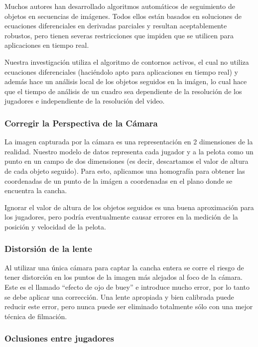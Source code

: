 \documentclass[a4paper,10pt]{article}
\begin{document}
Muchos autores han desarrollado algoritmos automáticos de seguimiento de
objetos en secuencias de imágenes. Todos ellos están basados en soluciones de
ecuaciones diferenciales en derivadas parciales y resultan aceptablemente
robustos, pero tienen severas restricciones que impiden que se utilicen para
aplicaciones en tiempo real.

Nuestra investigación utiliza el algoritmo de contornos activos, el cual no
utiliza ecuaciones diferenciales (haciéndolo apto para aplicaciones en tiempo
real) y además hace un análisis local de los objetos seguidos en la imágen, lo
cual hace que el tiempo de análisis de un cuadro sea dependiente de la
resolución de los jugadores e independiente de la resolución del video.

\subsubsection{Corregir la Perspectiva de la Cámara}

La imagen capturada por la cámara es una representación en 2 dimensiones de
la realidad. Nuestro modelo de datos representa cada jugador y a la pelota
como un punto en un campo de dos dimensiones (es decir, descartamos el valor
de altura de cada objeto seguido). Para esto, aplicamos una homografía para
obtener las coordenadas de un punto de la imágen a coordenadas en el plano
donde se encuentra la cancha.

Ignorar el valor de altura de los objetos seguidos es una buena aproximación
para los jugadores, pero podría eventualmente causar errores en la medición de
la posición y velocidad de la pelota.

\subsubsection{Distorsión de la lente}

Al utilizar una única cámara para captar la cancha entera se corre el riesgo de
tener distorción en los puntos de la imagen más alejados al foco de la cámara.
Este es el llamado ``efecto de ojo de buey'' e introduce mucho error, por lo
tanto se debe aplicar una corrección. Una lente apropiada y bien calibrada
puede reducir este error, pero nunca puede ser eliminado totalmente sólo con
una mejor técnica de filmación.

\subsubsection{Oclusiones entre jugadores}
\end{document}
